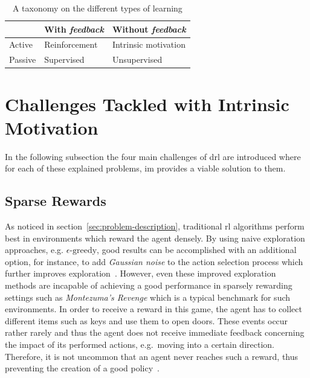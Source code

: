 \documentclass[draft,final]{vutinfth} %
\newcommand{\p}[1]{see p. #1}
\begin{document}
    \begin{table}
        \centering
        \begin{tabular}{|l|l|l|}
            \hline
            & With \textit{feedback} & Without \textit{feedback} \\
            \hline
            Active  & Reinforcement          & Intrinsic motivation      \\
            \hline
            Passive & Supervised             & Unsupervised              \\
            \hline
        \end{tabular}
        \caption[A taxonomy on the different types of learning]{A taxonomy on the different types of learning\protect\footnotemark}
        \label{tab:type_learning}
    \end{table}

    \footnotetext{\citep[\p{4}]{aubret_survey_2019}}


    \section{Challenges Tackled with Intrinsic Motivation}

    In the following subsection the four main challenges of \gls{drl} are introduced where for each of these explained problems, \gls{im} provides a viable solution to them.

    \subsection{Sparse Rewards}\label{subsec:sparse-rewards}

    As noticed in section~\ref{sec:problem-description}, traditional \gls{rl} algorithms perform best in environments which reward the agent densely.
    By using naive exploration approaches, e.g. $\epsilon\text{-greedy}$, good results can be accomplished with an additional option, for instance, to add \textit{Gaussian noise} to the action selection process which further improves exploration~\citep{lillicrap_continuous_2019}.
    However, even these improved exploration methods are incapable of achieving a good performance in sparsely rewarding settings such as \textit{Montezuma's Revenge} which is a typical benchmark for such environments.
    In order to receive a reward in this game, the agent has to collect different items such as keys and use them to open doors.
    These events occur rather rarely and thus the agent does not receive immediate feedback concerning the impact of its performed actions, e.g.\ moving into a certain direction.
    Therefore, it is not uncommon that an agent never reaches such a reward, thus preventing the creation of a good policy~\citep{aubret_survey_2019}.
\end{document}
